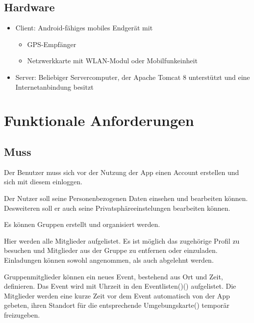 \documentclass[parskip=full,11pt]{scrartcl}
\begin{document}
\subsection{Hardware}
\begin{itemize}
    \item Client: Android-fähiges mobiles Endgerät mit
        \begin{itemize}
            \item GPS-Empfänger
            \item Netzwerkkarte mit WLAN-Modul oder Mobilfunkeinheit
        \end{itemize}
    \item Server: Beliebiger Servercomputer, der Apache Tomcat 8 unterstützt
        und eine Internetanbindung besitzt
\end{itemize}


\section{Funktionale Anforderungen}

\subsection{Muss}

Der Benutzer muss sich vor der Nutzung der App einen Account erstellen und sich mit diesem 
einloggen.

Der Nutzer soll seine Personenbezogenen Daten einsehen und bearbeiten können.
Desweiteren soll er auch seine Privatsphäreeinstelungen bearbeiten können.

Es können Gruppen erstellt und organisiert werden.

Hier werden alle Mitglieder aufgelistet.
Es ist möglich das zugehörige Profil zu besuchen und Mitglieder aus der Gruppe zu entfernen oder einzuladen.
Einladungen können sowohl angenommen, als auch abgelehnt werden.

Gruppenmitglieder können ein neues Event, bestehend aus Ort und Zeit, definieren.
Das Event wird mit Uhrzeit in den Eventlisten()() aufgelistet.
Die Mitglieder werden eine kurze Zeit vor dem Event automatisch von der App gebeten,
ihren Standort für die entsprechende Umgebungskarte() temporär freizugeben.
\end{document}
